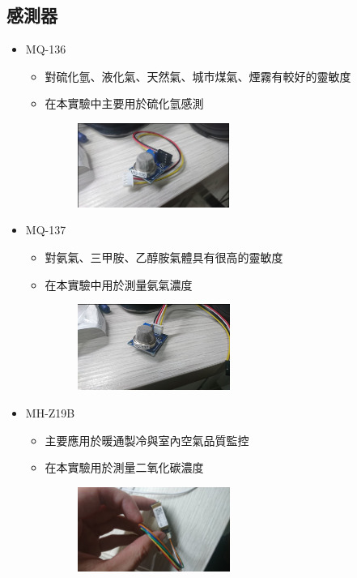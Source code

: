 	\subsection{感測器}
	\begin{itemize}
		\item MQ-136 \begin{itemize}
			\item 對硫化氫、液化氣、天然氣、城市煤氣、煙霧有較好的靈敏度
			\item 在本實驗中主要用於硫化氫感測
			\begin{figure}[H]
				\centering
				\includegraphics[width=0.5\textwidth]{pic/mq-136.png}
			\end{figure}
		\end{itemize}
		\item MQ-137 \begin{itemize}
			\item 對氨氣、三甲胺、乙醇胺氣體具有很高的靈敏度
			\item 在本實驗中用於測量氨氣濃度
			\begin{figure}[H]
				\centering
				\includegraphics[width=0.5\textwidth]{pic/mq-137.png}
			\end{figure}
		\end{itemize}
		\item MH-Z19B \begin{itemize}
			\item 主要應用於暖通製冷與室內空氣品質監控
			\item 在本實驗用於測量二氧化碳濃度
			\begin{figure}[H]
				\centering
				\includegraphics[width=0.5\textwidth]{pic/mh-z19B.png}
			\end{figure}
		\end{itemize}
	\end{itemize}
